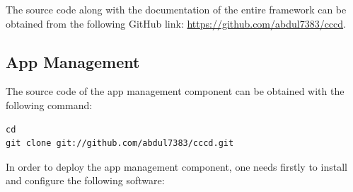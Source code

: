 The source code along with the documentation of the entire framework can be obtained from the following GitHub link: \url{https://github.com/abdul7383/cccd}.

\subsection{App Management\label{sec:eval_te_en_app}}
The source code of the app management component can be obtained with the following command:
\begin{code}
\begin{verbatim}
cd
git clone git://github.com/abdul7383/cccd.git
\end{verbatim}
\end{code}

In order to deploy the app management component, one needs firstly to install and configure the following software:

